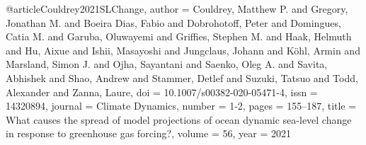 @article{Couldrey2021SLChange,
author = {Couldrey, Matthew P. and Gregory, Jonathan M. and {Boeira Dias}, Fabio and Dobrohotoff, Peter and Domingues, Catia M. and Garuba, Oluwayemi and Griffies, Stephen M. and Haak, Helmuth and Hu, Aixue and Ishii, Masayoshi and Jungclaus, Johann and K{\"{o}}hl, Armin and Marsland, Simon J. and Ojha, Sayantani and Saenko, Oleg A. and Savita, Abhishek and Shao, Andrew and Stammer, Detlef and Suzuki, Tatsuo and Todd, Alexander and Zanna, Laure},
doi = {10.1007/s00382-020-05471-4},
issn = {14320894},
journal = {Climate Dynamics},
number = {1-2},
pages = {155--187},
title = {{What causes the spread of model projections of ocean dynamic sea-level change in response to greenhouse gas forcing?}},
volume = {56},
year = {2021}
}















































































